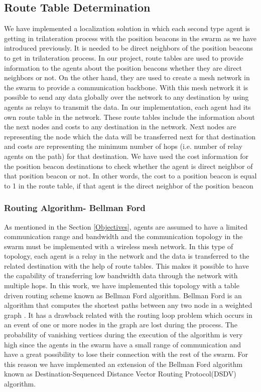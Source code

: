 	
\subsection{Route Table Determination} \label{route_route}
We have implemented a localization solution in which each second type agent is getting in trilateration process with the position beacons in the swarm as we have introduced previously. It is needed to be direct neighbors of the position beacons to get in trilateration process. In our project, route tables are used to provide information to the agents about the position beacons whether they are direct neighbors or not. On the other hand, they are used to create a mesh network in the swarm to provide a communication backbone. With this mesh network it is possible to send any data globally over the network to any destination by using agents as relays to transmit the data. In our implementation, each agent had its own route table in the network. These route tables include the information about the next nodes and costs to any destination in the network. Next nodes are representing the node which the data will be transferred next for that destination and costs are representing the minimum number of hops (i.e. number of relay agents on the path) for that destination. We have used the cost information for the position beacon destinations to check whether the agent is direct neighbor of that position beacon or not. In other words, the cost to a position beacon is equal to 1 in the route table, if that agent is the direct neighbor of the position beacon


	
\subsubsection{Routing Algorithm- Bellman Ford}
As mentioned in the Section \ref{Objectives}, agents are assumed to have a limited communication range and bandwidth and the communication topology in the swarm must be implemented with a wireless mesh network. In this type of topology, each agent is a relay in the network and the data is transferred to the related destination with the help of route tables. This makes it possible to have the capability of transferring low bandwidth data through the network with multiple hops.  In this work, we have implemented this topology with a table driven routing scheme known as Bellman Ford algorithm. Bellman Ford is an algorithm that computes the shortest paths between any two node in a weighted graph \cite{wiki_bellman}. It has a drawback related with the routing loop problem which occurs in an event of one or more nodes in the graph are lost during the process. The probability of vanishing vertices during the execution of the algorithm is very high since the agents in the swarm have a small range of communication and have a great possibility to lose their connection with the rest of the swarm. For this reason we have implemented an extension of the Bellman Ford algorithm known as Destination-Sequenced Distance Vector Routing Protocol(DSDV) algorithm.  
	
